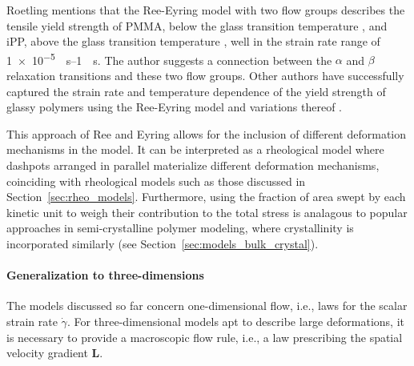 Roetling mentions that the Ree-Eyring model with two flow groups describes the tensile yield strength of PMMA, below the glass transition temperature \citep{roetlingYieldStressBehaviour1965}, and iPP, above the glass transition temperature \citep{roetlingYieldStressBehaviour1966}, well in the strain rate range of \SIrange{1e-5}{1}{\per\second}.
The author suggests a connection between the $\alpha$ and $\beta$ relaxation transitions and these two flow groups.
Other authors have successfully captured the strain rate and temperature dependence of the yield strength of glassy polymers using the Ree-Eyring model and variations thereof \citep{bauwensTensileYieldstressBehavior1969, bauwensRelationCompressionYield1972, bauwens-crowetCompressionYieldBehaviour1973, haussyThermodynamicAnalysisPlastic1980}.

This approach of Ree and Eyring allows for the inclusion of different deformation mechanisms in the model.
It can be interpreted as a rheological model where dashpots arranged in parallel materialize different deformation mechanisms, coinciding with rheological models such as those discussed in Section~\ref{sec:rheo_models}.
Furthermore, using the fraction of area swept by each kinetic unit to weigh their contribution to the total stress is analagous to popular approaches in semi-crystalline polymer modeling, where crystallinity is incorporated similarly (see Section~\ref{sec:models_bulk_crystal}).

\paragraph{Generalization to three-dimensions}
The models discussed so far concern one-dimensional flow, i.e., laws for the scalar strain rate $\dot \gamma$.
For three-dimensional models apt to describe large deformations, it is necessary to provide a macroscopic flow rule, i.e., a law prescribing the spatial velocity gradient $\bm L$.

